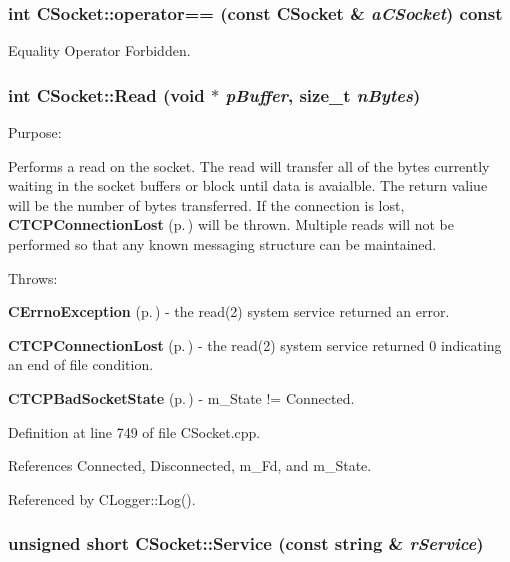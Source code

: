 \subsubsection{\setlength{\rightskip}{0pt plus 5cm}int CSocket::operator== (const CSocket \& {\em a\-CSocket}) const\hspace{0.3cm}{\tt  [private]}}\label{classCSocket_c2}


Equality Operator Forbidden.

\subsubsection{\setlength{\rightskip}{0pt plus 5cm}int CSocket::Read (void $\ast$ {\em p\-Buffer}, size\_\-t {\em n\-Bytes})}\label{classCSocket_a11}


Purpose:

Performs a read on the socket. The read will transfer all of the bytes currently waiting in the socket buffers or block until data is avaialble. The return valiue will be the number of bytes transferred. If the connection is lost, {\bf CTCPConnection\-Lost} {\rm (p.\,\pageref{classCTCPConnectionLost})} will be thrown. Multiple reads will not be performed so that any known messaging structure can be maintained.

Throws:\begin{CompactItemize}
\item 
{\bf CErrno\-Exception} {\rm (p.\,\pageref{classCErrnoException})} - the read(2) system service returned an error.\item 
{\bf CTCPConnection\-Lost} {\rm (p.\,\pageref{classCTCPConnectionLost})} - the read(2) system service returned 0 indicating an end of file condition.\item 
{\bf CTCPBad\-Socket\-State} {\rm (p.\,\pageref{classCTCPBadSocketState})} - m\_\-State != Connected. \end{CompactItemize}


Definition at line 749 of file CSocket.cpp.

References Connected, Disconnected, m\_\-Fd, and m\_\-State.

Referenced by CLogger::Log().
\subsubsection{\setlength{\rightskip}{0pt plus 5cm}unsigned short CSocket::Service (const string \& {\em r\-Service})\hspace{0.3cm}{\tt  [protected]}}\label{classCSocket_b2}



